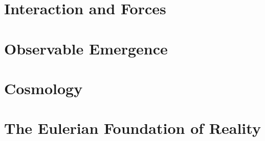 \documentclass[12pt, oneside]{book}
\theoremstyle{definition}
\begin{document}
\part{Interaction and Forces}










\part{Observable Emergence}








\part{Cosmology}










\part{The Eulerian Foundation of Reality}







\appendix

\end{document}
